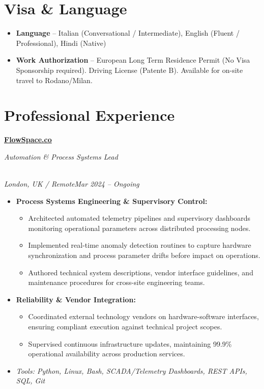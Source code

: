 \documentclass[a4paper,10pt]{article}
\newcommand{\role}[4]{\vspace{3pt}\noindent\hspace{0.6em}\parbox[t]{0.38\textwidth}{\raggedright\textbf{#1}}\hfill\parbox[t]{0.58\textwidth}{\raggedleft\textit{#2}}\\{\textit{#3}\hfill\textit{#4}}\vspace{1pt}}
\begin{document}
\section{Visa \& Language}
\begin{itemize}
\item \textbf{Language} -- Italian (Conversational / Intermediate), English (Fluent / Professional), Hindi (Native)
\item \textbf{Work Authorization} -- European Long Term Residence Permit (No Visa Sponsorship required). Driving License (Patente B). Available for on-site travel to Rodano/Milan.
\end{itemize}

\section{Professional Experience}
\role{\href{https://flowspace.co}{FlowSpace.co}}{Automation \& Process Systems Lead}{London, UK / Remote}{Mar 2024 -- Ongoing}
\begin{itemize}
\item \textbf{Process Systems Engineering \& Supervisory Control:}
\begin{itemize}[label=--]
\item Architected automated telemetry pipelines and supervisory dashboards monitoring operational parameters across distributed processing nodes.
\item Implemented real-time anomaly detection routines to capture hardware synchronization and process parameter drifts before impact on operations.
\item Authored technical system descriptions, vendor interface guidelines, and maintenance procedures for cross-site engineering teams.
\end{itemize}
\item \textbf{Reliability \& Vendor Integration:}
\begin{itemize}[label=--]
\item Coordinated external technology vendors on hardware-software interfaces, ensuring compliant execution against technical project scopes.
\item Supervised continuous infrastructure updates, maintaining 99.9\% operational availability across production services.
\end{itemize}
\item \textit{Tools: Python, Linux, Bash, SCADA/Telemetry Dashboards, REST APIs, SQL, Git}
\end{itemize}
\end{document}
